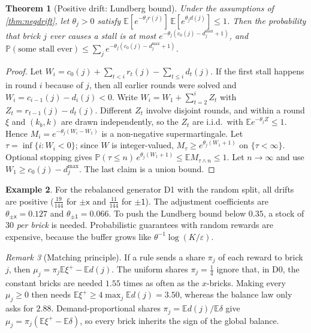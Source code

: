 \documentclass[11pt,a4paper]{article}
\newtheorem{theorem}{Theorem}[section]
\theoremstyle{definition}
\newtheorem{example}[theorem]{Example}
\theoremstyle{remark}
\newtheorem{remark}[theorem]{Remark}
\newcommand{\E}{\mathbb{E}}
\renewcommand{\P}{\mathbb{P}}
\newcommand{\pos}[1]{{#1}^{+}}
\begin{document}
\begin{theorem}[Positive drift: Lundberg bound]\label{thm:lundberg}
Under the assumptions of \cref{thm:negdrift}, let $\theta_j>0$ satisfy
$\E[e^{-\theta_j r(j)}]\,\E[e^{\theta_j d(j)}]\le1$. Then the probability that brick $j$
ever causes a stall is at most $e^{-\theta_j(c_0(j)-d_j^{\max}+1)}$, and
$\P(\text{some stall ever})\le\sum_j e^{-\theta_j(c_0(j)-d_j^{\max}+1)}$.
\end{theorem}
\begin{proof}
Let $W_i=c_0(j)+\sum_{t<i}r_t(j)-\sum_{t\le i}d_t(j)$. If the first stall happens in
round $i$ because of $j$, then all earlier rounds were solved and $W_i=c_{i-1}(j)-d_i(j)<0$.
Write $W_i=W_1+\sum_{t=2}^iZ_t$ with $Z_t=r_{t-1}(j)-d_t(j)$. Different $Z_t$ involve
disjoint rounds, and within a round $\xi$ and $(k_b,k)$ are drawn independently, so the
$Z_t$ are i.i.d.\ with $\E e^{-\theta_jZ}\le1$. Hence $M_i=e^{-\theta_j(W_i-W_1)}$ is a
non-negative supermartingale. Let $\tau=\inf\{i:W_i<0\}$; since $W$ is integer-valued,
$M_\tau\ge e^{\theta_j(W_1+1)}$ on $\{\tau<\infty\}$. Optional stopping gives
$\P(\tau\le n)\,e^{\theta_j(W_1+1)}\le\E M_{\tau\wedge n}\le1$. Let $n\to\infty$ and use
$W_1\ge c_0(j)-d_j^{\max}$. The last claim is a union bound.
\end{proof}

\begin{example}
For the rebalanced generator D1 with the random split, all drifts are positive
($\frac{19}{144}$ for $\pm\mathsf x$ and $\frac{11}{144}$ for $\pm\mathsf 1$). The adjustment
coefficients are $\theta_{\pm\mathsf x}=0.127$ and $\theta_{\pm\mathsf1}=0.066$. To push the
Lundberg bound below $0.35$, a stock of $30$ \emph{per brick} is needed.
Probabilistic guarantees with random rewards are expensive, because the buffer grows like
$\theta^{-1}\log(K/\varepsilon)$.
\end{example}

\begin{remark}[Matching principle]\label{rem:matching}
If a rule sends a share $\pi_j$ of each reward to brick $j$, then
$\mu_j=\pi_j\E\pos\xi-\E d(j)$. The uniform shares $\pi_j=\frac14$ ignore that, in D0,
the constant bricks are needed $1.55$ times as often as the $x$-bricks. Making every
$\mu_j\ge0$ then needs $\E\pos\xi\ge4\max_j\E d(j)=3.50$, whereas the balance law only
asks for $2.88$. Demand-proportional shares $\pi_j=\E d(j)/\E\delta$ give
$\mu_j=\pi_j(\E\pos\xi-\E\delta)$, so every brick inherits the sign of the global
balance.
\end{remark}
\end{document}
